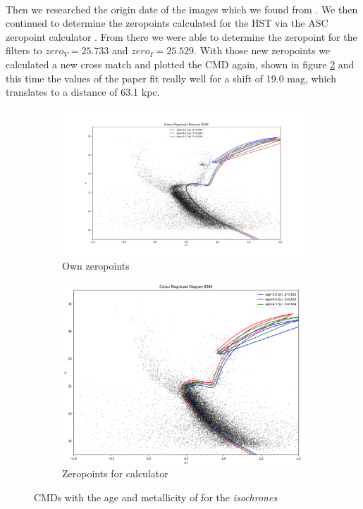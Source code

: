 \vspace{2mm}\\
Then we researched the origin date of the images which we found from \cite{HST_visit_report}. We then continued to determine the zeropoints calculated for the HST via the ASC zeropoint calculator \cite{HST_zeropoint}. From there we were able to determine the zeropoint for the filters to $zero_V = 25.733$ and $zero_I = 25.529$. With those new zeropoints we calculated a new cross match and plotted the CMD again, shown in figure \ref{cmd3} and this time the values of the paper fit really well for a shift of 19.0 mag, which translates to a distance of 63.1 kpc.
\begin{figure}[h]
	\begin{subfigure}{0.45\textwidth}
	\centering
	\includegraphics[width=0.95\linewidth]{report_pictures/PaperPepega.png}
	\caption{Own zeropoints}
	\label{cmd2}
	\end{subfigure}
	\begin{subfigure}{0.45\textwidth}
	\centering
	\includegraphics[width=0.95\linewidth]{report_pictures/PaperOwn.png}
	\caption{Zeropoints for calculator}
	\label{cmd3}
	\end{subfigure}
	\caption{CMDs with the age and metallicity of \cite{rochau2007star} for the \textit{isochrones}}
	\label{cmd4}
\end{figure}